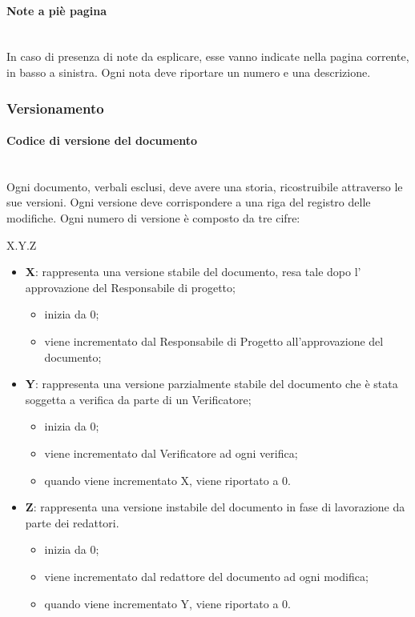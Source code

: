 		\paragraph{Note a piè pagina} \mbox{}\\
		In caso di presenza di note da esplicare, esse vanno indicate nella pagina corrente, in basso a sinistra. Ogni nota deve riportare un numero e una descrizione.
	\subsubsection{Versionamento}	
		\paragraph{Codice di versione del documento} \mbox{}\\
		Ogni documento, verbali esclusi, deve avere una storia, ricostruibile attraverso le sue versioni. Ogni versione deve corrispondere a una riga del registro delle modifiche. Ogni numero di versione è composto da tre cifre:
		\begin{center}
			X.Y.Z
		\end{center}
		\begin{itemize}
			\item \textbf{X}: rappresenta una versione stabile del documento, resa tale dopo l' approvazione del Responsabile di progetto;
			\begin{itemize}
				\item inizia da 0;
				\item viene incrementato dal Responsabile di Progetto all'approvazione
				del documento;
			\end{itemize}
			\item \textbf{Y}: rappresenta una versione parzialmente stabile del documento che è stata soggetta a verifica da parte di un Verificatore;
			\begin{itemize}
				\item inizia da 0;
				\item viene incrementato dal Verificatore ad ogni verifica;
				\item quando viene incrementato X, viene riportato a 0.
			\end{itemize}
			\item \textbf{Z}: rappresenta una versione instabile del documento in fase di lavorazione da parte dei redattori.
			\begin{itemize}
				\item inizia da 0;
				\item viene incrementato dal redattore del documento ad ogni modifica;
				\item quando viene incrementato Y, viene riportato a 0.
			\end{itemize}			
		\end{itemize}
